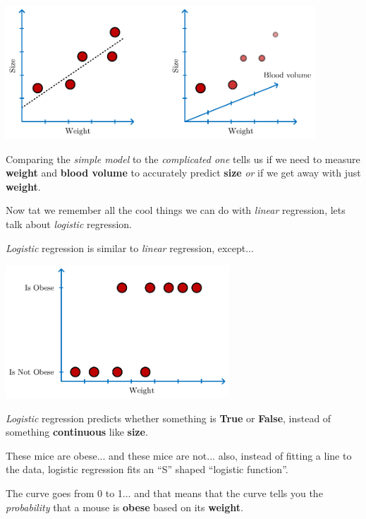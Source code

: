 \documentclass[
	final,
	a4paper,
	oneside,
	parskip=full,
	headings=standardclasses,
	headings=big,
	pointednumbers
]{scrartcl}
\newcommand{\tb}[1]{\textbf{#1}}
\newcommand{\ti}[1]{\textit{#1}}
\begin{document}
    \begin{center}
        \includegraphics[height=5cm]{StatQuest_Logistic_Regression_Normal_vs_Multiple.pdf}
    \end{center}

    Comparing the \ti{simple model} to the \ti{complicated one} tells us if we need
    to measure \tb{weight} and \tb{blood volume} to accurately predict \tb{size} \ti{or}
    if we get away with just \tb{weight}.

    Now tat we remember all the cool things we can do with  \ti{linear} regression,
    lets talk about \ti{logistic} regression.

    \ti{Logistic} regression is similar to \ti{linear} regression, except...

    \begin{center}
        \includegraphics[height=5cm]{StatQuest_Logistic_Regression_Logistic_Obese.pdf}
    \end{center}
    
    \ti{Logistic} regression predicts whether something is \tb{True} or \tb{False}, instead
    of something \tb{continuous} like \tb{size}.

    These mice are obese... and these mice are not... also, instead of fitting a line to the data,
    logistic regression fits an ``S'' shaped ``logistic function''.

    The curve goes from 0 to 1... and that means that the curve tells you the \ti{probability}
    that a mouse is \tb{obese} based on its \tb{weight}.
\end{document}
